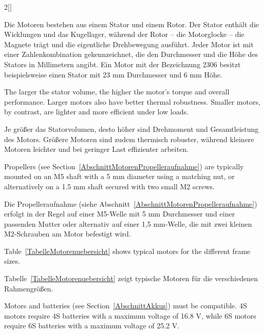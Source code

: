 \begin{paracol}{2}[]
\colger

Die Motoren bestehen aus einem Stator und einem Rotor. Der Stator enthält die Wicklungen und das Kugellager, während der Rotor -- die Motorglocke -- die Magnete trägt und die eigentliche Drehbewegung ausführt. Jeder Motor ist mit einer Zahlenkombination gekennzeichnet, die den Durchmesser und die Höhe des Stators in Millimetern angibt. Ein Motor mit der Bezeichnung 2306 besitzt beispielsweise einen Stator mit 23 mm Durchmesser und 6 mm Höhe.

\coleng

The larger the stator volume, the higher the motor’s torque and overall performance. Larger motors also have better thermal robustness. Smaller motors, by contrast, are lighter and more efficient under low loads.

\colger

Je größer das Statorvolumen, desto höher sind Drehmoment und Gesamtleistung des Motors. Größere Motoren sind zudem thermisch robuster, während kleinere Motoren leichter und bei geringer Last effizienter arbeiten.

\coleng

Propellers (see Section~\ref{AbschnittMotorenPropelleraufnahme}) are typically mounted on an M5 shaft with a 5 mm diameter using a matching nut, or alternatively on a 1.5 mm shaft secured with two small M2 screws.

\colger

Die Propelleraufnahme (siehe Abschnitt~\ref{AbschnittMotorenPropelleraufnahme}) erfolgt in der Regel auf einer M5-Welle mit 5 mm Durchmesser und einer passenden Mutter oder alternativ auf einer 1,5 mm-Welle, die mit zwei kleinen M2-Schrauben am Motor befestigt wird.


Table~\ref{TabelleMotorenuebersicht} shows typical motors for the different frame sizes.

\colger

Tabelle~\ref{TabelleMotorenuebersicht} zeigt typische Motoren für die verschiedenen Rahmengrößen.

\colende



\renewcommand{\deutschertitel}{Elektrische Spannung}
\renewcommand{\englischertitel}{Electrical Voltage}
\makrounterabschnitt
\label{AbschnittMotorenVolt}

Motors and batteries (see Section~\ref{AbschnittAkkus}) must be compatible. 4S motors require 4S batteries with a maximum voltage of 16.8 V, while 6S motors require 6S batteries with a maximum voltage of 25.2 V.


\end{paracol}

